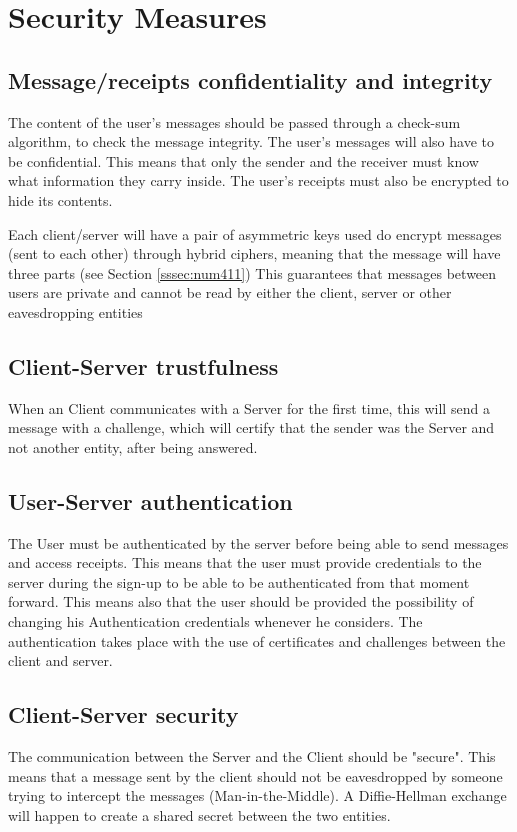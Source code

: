 
\newpage

\section{Security Measures}

\subsection{Message/receipts confidentiality and integrity}
The content of the user's messages should be passed through a check-sum algorithm, to check the message integrity.
The user's messages will also have to be confidential. This means that only the sender and the receiver must know what information they carry inside. The user's receipts must also be encrypted to hide its contents.

Each client/server will have a pair of asymmetric keys used do encrypt messages (sent to each other) through hybrid ciphers, meaning that the message will have three parts (see Section \ref{sssec:num411}) This guarantees that messages between users are private and cannot be read by either the client, server or other eavesdropping entities

\subsection{Client-Server trustfulness}
When an Client communicates with a Server for the first time, this will send a message with a challenge, which will certify that the sender was the Server and not another entity, after being answered.

\subsection{User-Server authentication}
The User must be authenticated by the server before being able to send messages and access receipts. This means that the user must provide credentials to the server during the sign-up to be able to  be authenticated from that moment forward. This means also that the user should be provided the possibility of changing his Authentication credentials whenever he considers.
The authentication takes place with the use of certificates and challenges between the client and server. %

\subsection{Client-Server security}
The communication between the Server and the Client should be "secure". This means that a message sent by the client should not be eavesdropped by someone trying to intercept the messages (Man-in-the-Middle).
A Diffie-Hellman exchange will happen to create a shared secret between the two entities.

